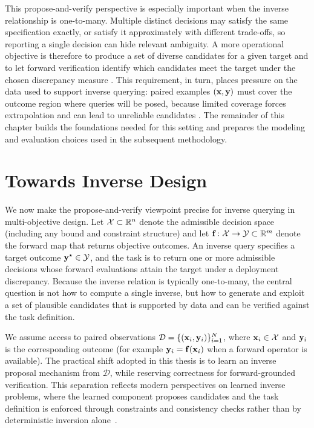 This propose-and-verify perspective is especially important when the inverse relationship is one-to-many. Multiple distinct decisions may satisfy the same specification exactly, or satisfy it approximately with different trade-offs, so reporting a single decision can hide relevant ambiguity. A more operational objective is therefore to produce a set of diverse candidates for a given target and to let forward verification identify which candidates meet the target under the chosen discrepancy measure \cite{Ardizzone2019INN, Ma2019AdvMater}. This requirement, in turn, places pressure on the data used to support inverse querying: paired examples $(\mathbf{x},\mathbf{y})$ must cover the outcome region where queries will be posed, because limited coverage forces extrapolation and can lead to unreliable candidates \cite{Tan2023}. The remainder of this chapter builds the foundations needed for this setting and prepares the modeling and evaluation choices used in the subsequent methodology.


\section{Towards Inverse Design}\label{sec:inverse_data_eval}

We now make the propose-and-verify viewpoint precise for inverse querying in multi-objective design. Let $\mathcal{X}\subset\mathbb{R}^n$ denote the admissible decision space (including any bound and constraint structure) and let $\mathbf{f}\colon\mathcal{X}\rightarrow\mathcal{Y}\subset\mathbb{R}^m$ denote the forward map that returns objective outcomes. An inverse query specifies a target outcome $\mathbf{y}^\star\in\mathcal{Y}$, and the task is to return one or more admissible decisions whose forward evaluations attain the target under a deployment discrepancy. Because the inverse relation is typically one-to-many, the central question is not how to compute a single inverse, but how to generate and exploit a set of plausible candidates that is supported by data and can be verified against the task definition.

We assume access to paired observations $\mathcal{D}=\{(\mathbf{x}_i,\mathbf{y}_i)\}_{i=1}^N$, where $\mathbf{x}_i\in\mathcal{X}$ and $\mathbf{y}_i$ is the corresponding outcome (for example $\mathbf{y}_i=\mathbf{f}(\mathbf{x}_i)$ when a forward operator is available). The practical shift adopted in this thesis is to learn an inverse proposal mechanism from $\mathcal{D}$, while reserving correctness for forward-grounded verification. This separation reflects modern perspectives on learned inverse problems, where the learned component proposes candidates and the task definition is enforced through constraints and consistency checks rather than by deterministic inversion alone~\cite{Ongie2020}.

